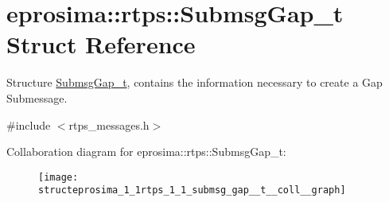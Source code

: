\hypertarget{structeprosima_1_1rtps_1_1_submsg_gap__t}{\section{eprosima\-:\-:rtps\-:\-:\-Submsg\-Gap\-\_\-t \-Struct \-Reference}
\label{structeprosima_1_1rtps_1_1_submsg_gap__t}
}


\-Structure \hyperlink{structeprosima_1_1rtps_1_1_submsg_gap__t}{\-Submsg\-Gap\-\_\-t}, contains the information necessary to create a \-Gap \-Submessage.  




{\ttfamily \#include $<$rtps\-\_\-messages.\-h$>$}



\-Collaboration diagram for eprosima\-:\-:rtps\-:\-:\-Submsg\-Gap\-\_\-t\-:\nopagebreak
\begin{figure}[H]
\begin{center}
\leavevmode
\texttt{[image: structeprosima\_1\_1rtps\_1\_1\_submsg\_gap\_\_t\_\_coll\_\_graph]}
\end{center}
\end{figure}
